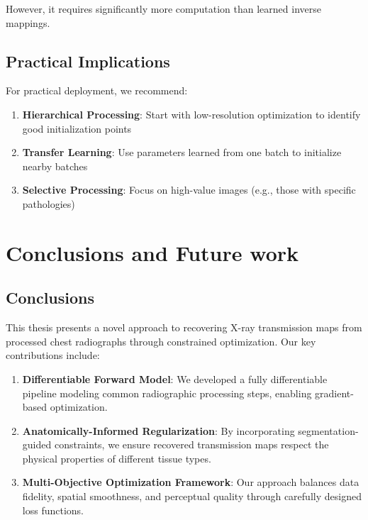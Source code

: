 \documentclass[nomenclature, english, bibtex]{kththesis}
\numberwithin{listing}{chapter}
\begin{document}
However, it requires significantly more computation than learned inverse mappings.

\section{Practical Implications}
For practical deployment, we recommend:
\begin{enumerate}
    \item \textbf{Hierarchical Processing}: Start with low-resolution optimization to identify good initialization points
    \item \textbf{Transfer Learning}: Use parameters learned from one batch to initialize nearby batches
    \item \textbf{Selective Processing}: Focus on high-value images (e.g., those with specific pathologies)
\end{enumerate}

\cleardoublepage
\chapter{Conclusions and Future work}
\label{ch:conclusionsAndFutureWork}

\section{Conclusions}
\label{sec:conclusions}

This thesis presents a novel approach to recovering X-ray transmission maps from processed chest radiographs through constrained optimization. Our key contributions include:

\begin{enumerate}
    \item \textbf{Differentiable Forward Model}: We developed a fully differentiable pipeline modeling common radiographic processing steps, enabling gradient-based optimization.

    \item \textbf{Anatomically-Informed Regularization}: By incorporating segmentation-guided constraints, we ensure recovered transmission maps respect the physical properties of different tissue types.

    \item \textbf{Multi-Objective Optimization Framework}: Our approach balances data fidelity, spatial smoothness, and perceptual quality through carefully designed loss functions.
\end{enumerate}
\end{document}
